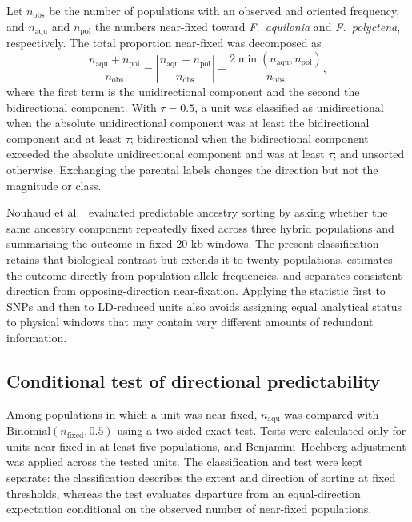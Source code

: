 \documentclass[11pt]{article}
\newcommand{\Faq}{\textit{F.~aquilonia}}
\newcommand{\Fpo}{\textit{F.~polyctena}}
\begin{document}
Let \(n_{\mathrm{obs}}\) be the number of populations with an observed and
oriented frequency, and \(n_{\mathrm{aqu}}\) and \(n_{\mathrm{pol}}\) the
numbers near-fixed toward \Faq{} and \Fpo{}, respectively. The total proportion
near-fixed was decomposed as
\begin{equation}
\frac{n_{\mathrm{aqu}}+n_{\mathrm{pol}}}{n_{\mathrm{obs}}}
=
\left|\frac{n_{\mathrm{aqu}}-n_{\mathrm{pol}}}{n_{\mathrm{obs}}}\right|
+
\frac{2\min(n_{\mathrm{aqu}},n_{\mathrm{pol}})}{n_{\mathrm{obs}}},
\label{eq:sorting}
\end{equation}
where the first term is the unidirectional component and the second the
bidirectional component. With \(\tau=0.5\), a unit was classified as
unidirectional when the absolute unidirectional component was at least the
bidirectional component and at least \(\tau\); bidirectional when the
bidirectional component exceeded the absolute unidirectional component and was
at least \(\tau\); and unsorted otherwise. Exchanging the parental labels
changes the direction but not the magnitude or class.

Nouhaud et al.~\cite{nouhaud2022} evaluated predictable ancestry sorting by
asking whether the same ancestry component repeatedly fixed across three hybrid
populations and summarising the outcome in fixed 20-kb windows. The present
classification retains that biological contrast but extends it to twenty
populations, estimates the outcome directly from population allele frequencies,
and separates consistent-direction from opposing-direction near-fixation.
Applying the statistic first to SNPs and then to LD-reduced units also avoids
assigning equal analytical status to physical windows that may contain very
different amounts of redundant information.

\subsection{Conditional test of directional predictability}

Among populations in which a unit was near-fixed,
\(n_{\mathrm{aqu}}\) was compared with
\(\mathrm{Binomial}(n_{\mathrm{fixed}},0.5)\) using a two-sided exact test.
Tests were calculated only for units near-fixed in at least five populations,
and Benjamini--Hochberg adjustment was applied across the tested units. The
classification and test were kept separate: the classification describes the
extent and direction of sorting at fixed thresholds, whereas the test evaluates
departure from an equal-direction expectation conditional on the observed
number of near-fixed populations.
\end{document}
